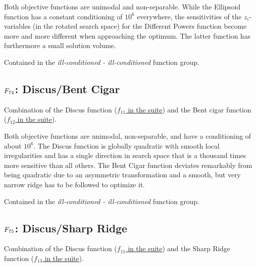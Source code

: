 Both objective functions are unimodal and non-separable. While the
Ellipsoid function has a constant conditioning of \(10^6\) everywhere,
the sensitivities of the \(z_i\)-variables (in the rotated search space)
for the Different Powers function become more and more different when
approaching the optimum. The latter function has furthermore a small
solution volume.

Contained in the \emph{ill-conditioned - ill-conditioned} function group.



\subsection[\texorpdfstring{\protect\(F_{74}\protect\): Discus/Bent Cigar}{F74: Discus/Bent Cigar}]{\texorpdfstring{\protect\(F_{74}\protect\): Discus/Bent Cigar}{}}
\label{index:f74}\label{index:discus-bent-cigar}
Combination of the Discus function (\href{https://coco.gforge.inria.fr/downloads/download16.00/bbobdocfunctions.pdf\#page=55}{\(f_{11}\) in the \bbob suite}) and the
Bent cigar function (\href{https://coco.gforge.inria.fr/downloads/download16.00/bbobdocfunctions.pdf\#page=60}{\(f_{12}\) in the \bbob suite}).

Both objective functions are unimodal, non-separable, and have a conditioning
of about \(10^6\).
The Discus function is globally quadratic with smooth local irregularities
and has a single direction in search space that is a thousand times more
sensitive than all others. The Bent Cigar function deviates remarkably
from being quadratic due to an asymmetric transformation and a smooth,
but very narrow ridge has to be followed to optimize it.

Contained in the \emph{ill-conditioned - ill-conditioned} function group.



\subsection[\texorpdfstring{\protect\(F_{75}\protect\): Discus/Sharp Ridge}{F75: Discus/Sharp Ridge}]{\texorpdfstring{\protect\(F_{75}\protect\): Discus/Sharp Ridge}{}}
\label{index:discus-sharp-ridge}\label{index:f75}
Combination of the Discus function (\href{https://coco.gforge.inria.fr/downloads/download16.00/bbobdocfunctions.pdf\#page=55}{\(f_{11}\) in the \bbob suite}) and the
Sharp Ridge function (\href{https://coco.gforge.inria.fr/downloads/download16.00/bbobdocfunctions.pdf\#page=65}{\(f_{13}\) in the \bbob suite}).

